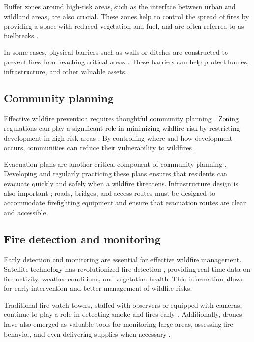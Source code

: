 \documentclass[
  12 pt,
]{Nemilov}
\begin{document}
Buffer zones around high-risk areas, such as the interface between urban and wildland areas, are also crucial. These zones help to control the spread of fires by providing a space with reduced vegetation and fuel, and are often referred to as fuelbreaks \citep{ascoli2020firebreak, wang2021ecological}.

In some cases, physical barriers such as walls or ditches are constructed to prevent fires from reaching critical areas \citep{ankur2017fire}. These barriers can help protect homes, infrastructure, and other valuable assets.

\subsection{Community planning}\label{community-planning}

Effective wildfire prevention requires thoughtful community planning \citep{haines2008review}. Zoning regulations can play a significant role in minimizing wildfire risk by restricting development in high-risk areas \citep{mockrin2020after}. By controlling where and how development occurs, communities can reduce their vulnerability to wildfires \citep{mcwethy2019rethinking}.

Evacuation plans are another critical component of community planning \citep{toledo2018analysis}. Developing and regularly practicing these plans ensures that residents can evacuate quickly and safely when a wildfire threatens. Infrastructure design is also important \citep{gonzalez2018establishing, intini2020guidance, zehra2024systematic}; roads, bridges, and access routes must be designed to accommodate firefighting equipment and ensure that evacuation routes are clear and accessible.

\subsection{Fire detection and monitoring}\label{fire-detection-and-monitoring}

Early detection and monitoring are essential for effective wildfire management. Satellite technology has revolutionized fire detection \citep{davies2008fire}, providing real-time data on fire activity, weather conditions, and vegetation health. This information allows for early intervention and better management of wildfire risks.

Traditional fire watch towers, staffed with observers or equipped with cameras, continue to play a role in detecting smoke and fires early \citep{zhang2020integrating}. Additionally, drones have also emerged as valuable tools for monitoring large areas, assessing fire behavior, and even delivering supplies when necessary \citep{afghah2019wildfire, aydin2019use}.
\end{document}
